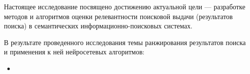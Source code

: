 Настоящее исследование посвящено достижению актуальной цели --- разработке методов и алгоритмов
оценки релевантности поисковой выдачи (результатов поиска) в семантических информационно-поисковых системах.

В результате проведенного исследования темы ранжирования результатов поиска и применения к ней нейросетевых алгоритмов:
\begin{itemize}
    \item 
\end{itemize}